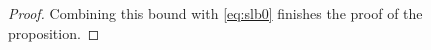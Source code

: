 \documentclass{amsart}
\numberwithin{equation}{section}
\def\corEE{\textcolor{amethyst}}
\def\corEE{}
\begin{document}
\begin{proof}
%

\noindent
\corEE{Combining this bound with \eqref{eq:slb0} finishes the proof of the proposition.}
%
\end{proof}
\end{document}
